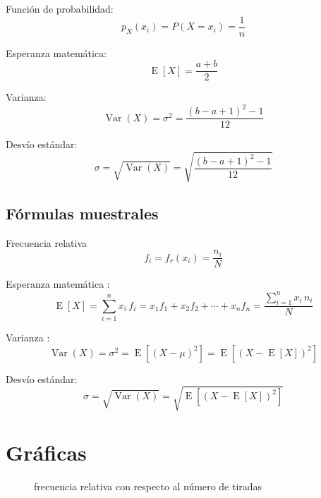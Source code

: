 \documentclass{article}
\begin{document}
Función de probabilidad:
\begin{equation}
p_X(x_i) = P(X = x_i) = \frac{1}{n}
\end{equation}

Esperanza matemática:
\begin{equation}
\operatorname{E}[X] = \frac{a+b}{2}
\end{equation}

Varianza:
\begin{equation}
\operatorname{Var}(X) = \sigma^{2} = \frac{(b-a+1)^{2}-1}{12}
\end{equation}

Desvío estándar:
\begin{equation}
\sigma = \sqrt{\operatorname{Var}(X)} = \sqrt{\frac{(b-a+1)^{2}-1}{12}}
\end{equation}

\subsection{Fórmulas muestrales}
Frecuencia relativa \cite{wiki-frecuencia}
\begin{equation}
f_{i} = f_{r}(x_{i}) = \frac {n_{i}}{N}
\end{equation}

Esperanza matemática \cite{wiki-esperanza}:
\begin{equation}
\operatorname{E}[X] = \sum_{i=1}^{n}x_{i}\,f_{i}=x_{1}f_{1}+x_{2}f_{2}+\cdots +x_{n}f_{n} = \frac{\sum_{i=1}^{n}x_{i}\,n_{i}}{N}
\end{equation}

Varianza \cite{wiki-varianza}:
\begin{equation}
\operatorname{Var}(X) = \sigma^{2} = \operatorname{E}\left[(X - \mu)^{2}\right] = \operatorname{E}\left[(X - \operatorname{E}[X])^{2}\right]
\end{equation}

Desvío estándar:
\begin{equation}
\sigma = \sqrt{\operatorname{Var}(X)} = \sqrt{\operatorname{E}\left[(X - \operatorname{E}[X])^{2}\right]}
\end{equation}

\section{Gráficas}
\begin{figure}[H]
  \begin{mytikzresize}{0.8\textwidth}
    \centering
    
    \caption{frecuencia relativa con respecto al número de tiradas}
  \end{mytikzresize}
\end{figure}
\end{document}
